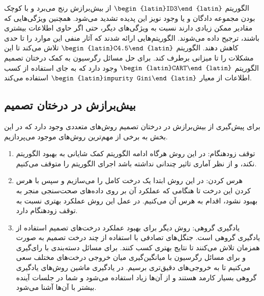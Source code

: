الگوریتم $\text{\begin{latin}ID3\end{latin}}$ از بیش‌برازش رنج می‌برد و با کوچک بودن مجموعه دادگان و یا وجود نویز این پدیده تشدید می‌شود. همچنین ویژگی‌هایی که مقادیر ممکن زیادی دارند نسبت به ویژگی‌های دیگر، حتی اگر حاوی اطلاعات بیشتری باشند، ترجیح داده می‌شوند. الگوریتم‌هایی ارائه شدند که آثار منفی این موارد را تا حدی کاهش دهند.
الگوریتم \href{https://en.wikipedia.org/wiki/C4.5_algorithm}{$\text{\begin{latin}C4.5\end{latin}}$} تلاش می‌کند تا این مشکلات را تا میزانی برطرف کند. برای حل مسائل رگرسیون به کمک درختان تصمیم الگوریتم \href{https://en.wikipedia.org/wiki/Decision_tree_learning}{$\text{\begin{latin}CART\end{latin}}$} وجود دارد که به جای استفاده از کسب اطلاعات از معیار $\text{\begin{latin}impurity Gini\end{latin}}$ استفاده می‌کند. 


\subsection{بیش‌برازش در درختان تصمیم}
برای پیش‌گیری از بیش‌برازش در درختان تصمیم روش‌های متعددی وجود دارد که در این بخش به برخی از مهم‌ترین روش‌های موجود می‌پردازیم.
\begin{enumerate}
    \item توقف زودهنگام: در این روش هرگاه ادامه الگوریتم کمک شایانی به بهبود الگوریتم نکند، و از نظر آماری تاثیر چندانی نداشته باشد اجرای الگوریتم را متوقف می‌کنیم.
    \item هرس کردن: در این روش ابتدا یک درخت کامل را می‌سازیم و سپس با هرس کردن این درخت تا هنگامی که عملکرد آن بر روی داده‌های صحت‌سنجی منجر به بهبود نشود، اقدام به هرس آن می‌کنیم. در عمل این روش عملکرد بهتری نسبت به توقف زودهنگام دارد.
    \item یادگیری گروهی: روش دیگر برای بهبود عملکرد درخت‌های تصمیم استفاده از یادگیری گروهی است. جنگل‌های تصادفی با استفاده از چند درخت‌ تصمیم به صورت همزمان تلاش می‌کنند تا نتایج بهتری کسب کنند. برای مسائل دسته‌بندی با رای‌گیری و برای مسائل رگرسیون با میانگین‌گیری میان خروجی درخت‌های مختلف سعی می‌کنیم تا به خروجی‌های دقیق‌تری برسیم. در یادگیری ماشین روش‌های یادگیری گروهی بسیار کارمد هستند و از آن‌ها زیاد استفاده می‌شود و شما در جلسات آینده بیشتر با آن‌ها آشنا می‌شود.
\end{enumerate}